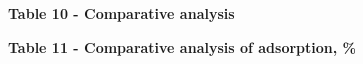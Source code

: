 {\bfseries Table 10 - Comparative analysis}


{\bfseries Table 11 - Comparative analysis of adsorption, \%}

